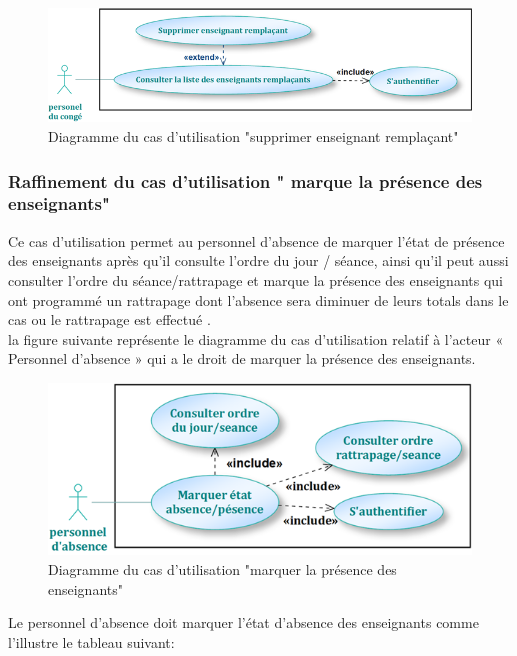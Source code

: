 \documentclass[12 pt]{report}
\begin{document}
\begin{figure}[h]
 \begin{center}
\includegraphics[width=13 cm ,height= 4 cm]{sup_ens_remp.PNG}
\caption{Diagramme du cas d’utilisation "supprimer enseignant remplaçant"}
\end{center}
\end{figure}
\subsubsection{Raffinement du cas d'utilisation " marque la présence des enseignants"}
Ce cas d'utilisation permet au personnel d'absence de marquer l'état 
de présence des enseignants après qu'il consulte l'ordre du jour / séance, ainsi qu'il  peut aussi consulter l'ordre du séance/rattrapage 
et marque la présence des enseignants qui ont programmé un rattrapage dont l'absence  sera diminuer  de leurs totals dans  le cas ou le rattrapage est effectué .\\
la figure suivante représente le diagramme du cas d’utilisation  relatif à l’acteur « Personnel d'absence » qui a le droit de  marquer la présence des enseignants.
\begin{figure}[h]
 \begin{center}
\includegraphics[width=13 cm ,height=5 cm]{mar_abs.PNG}
\caption{Diagramme du cas d’utilisation "marquer la présence des enseignants"}
\end{center}
\end{figure}
\newpage
Le personnel d'absence doit marquer l'état d'absence des enseignants comme l’illustre le tableau suivant:
\end{document}
